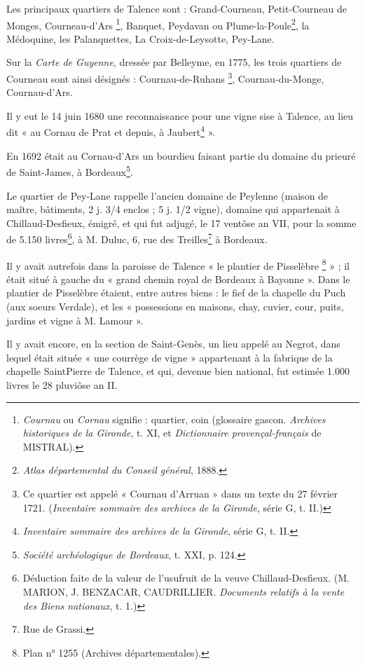Les principaux quartiers de Talence sont : Grand-Courneau, Petit-Courneau de Monges, Courneau-d'Ars \footnote{\textit{Cournau} ou \textit{Cornau} signifie : quartier, coin (glossaire gascon. \textit{Archives historiques de la Gironde}, t. XI, et \textit{Dictionnaire provençal-français} de MISTRAL). }, Banquet, Peydavan ou Plume-la-Poule\footnote{\textit{Atlas départemental du Conseil général}, 1888.}, la Médoquine, les Palanquettes, La Croix-de-Leysotte, Pey-Lane. 

Sur la \textit{Carte de Guyenne}, dressée par Belleyme, en 1775, les trois quartiers de Courneau sont ainsi désignés : Cournau-de-Ruhans \footnote{Ce quartier est appelé « Cournau d'Arruan » dans un texte du 27 février 1721. (\textit{Inventaire sommaire des archives de la Gironde}, série G, t. II.) }, Cournau-du-Monge, Cournau-d'Ars. 

Il y eut le 14 juin 1680 une reconnaissance pour une vigne sise à Talence, au lieu dit « au Cornau de Prat et depuis, à Jaubert\footnote{\textit{Inventaire sommaire des archives de la Gironde}, série G, t. II.} ».

En 1692 était au Cornau-d'Ars un bourdieu faisant partie du domaine du prieuré de Saint-James, à Bordeaux\footnote{\textit{Société archéologique de Bordeaux}, t. XXI, p. 124. }. 

Le quartier de Pey-Lane rappelle l'ancien domaine de Peylenne (maison de maître, bâtiments, 2 j. 3/4 enclos ; 5 j. 1/2 vigne), domaine qui appartenait à Chillaud-Desfieux, émigré, et qui fut adjugé, le 17 ventôse an VII, pour la somme de 5.150 livres\footnote{Déduction faite de la valeur de l'usufruit de la veuve Chillaud-Desfieux. (M. MARION, J. BENZACAR, CAUDRILLIER. \textit{Documents relatifs à la vente des Biens nationaux}, t. 1.)}, à M. Duluc, 6, rue des Treilles\footnote{ Rue de Grassi.} à Bordeaux. 

Il y avait autrefois dans la paroisse de Talence « le plantier de Pisselèbre \footnote{Plan n° 1255 (Archives départementales). } » ; il était situé à gauche du « grand chemin royal de Bordeaux à Bayonne ». Dans le plantier de Pisselèbre étaient, entre autres biens : le fief de la chapelle du Puch (aux soeurs Verdale), et les « possessions en maisons, chay, cuvier, cour, puits, jardins et vigne à M. Lamour ».

Il y avait encore, en la section de Saint-Genès, un lieu appelé au Negrot, dans lequel était située « une courrège de vigne » appartenant à la fabrique de la chapelle SaintPierre de Talence, et qui, devenue bien national, fut estimée 1.000 livres le 28 pluviôse an II. 

